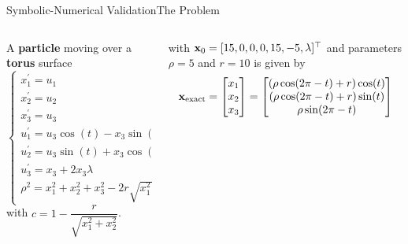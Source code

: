 \begin{frame}{Symbolic-Numerical Validation}{The Problem}
  \begin{columns}
    \begin{column}[t]{0.425\textwidth}
      A \textbf{particle} moving over a \textbf{torus} surface%
      \begin{equation*}
        \label{chap4:eq:torus}
        \begin{cases}
          x^{\prime}_{1} = u_{1} \\
          x^{\prime}_{2} = u_{2} \\
          x^{\prime}_{3} = u_{3} \\
          u^{\prime}_{1} = u_{3}\cos(t) - x_{3}\sin(t) - u_{2} + 2 c x_{1}\lambda \\
          u^{\prime}_{2} = u_{3}\sin(t) + x_{3}\cos(t) + u_{1} + 2 c x_{2}\lambda \\
          u^{\prime}_{3} = x_{3} + 2x_{3}\lambda \\[-0.1em]
          \rho^2 = x_{1}^2 + x_{2}^2 + x_{3}^2 - 2r\sqrt{x_{1}^2 + x_{2}^2} + r^2
        \end{cases}
      \end{equation*}
      with $c = 1 - \dfrac{r}{\sqrt{x_{1}^2 + x_{2}^2}}$.
    \end{column}
    \begin{column}[t]{0.575\textwidth}
      \vspace{-3.0em}
      with $\mathbf{x}_{0} = [15, 0, 0, 0, 15, -5, \lambda]^{\top}$ and parameters $\rho = 5$ and $r = 10$ is given by
      \begin{equation*}
        \mathbf{x}_\text{exact} = \begin{bmatrix}
          x_{1} \\ x_{2} \\ x_{3}
        \end{bmatrix} = \begin{bmatrix}
          (\rho \cos(2\pi - t) + r) \cos(t) \\
          (\rho \cos(2\pi - t) + r) \sin(t) \\
          \rho \sin(2\pi - t)
        \end{bmatrix}
      \end{equation*} \\[-3.0em]
      \centering{
}
\end{column}
\end{columns}
\end{frame}
